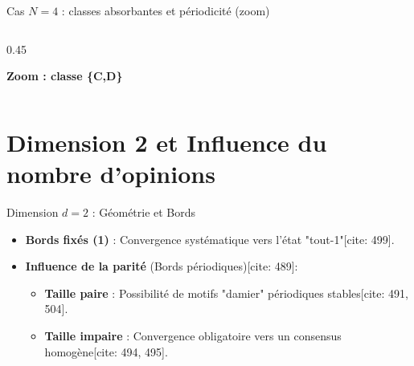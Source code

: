\documentclass{beamer}
\begin{document}
\begin{frame}{Cas $N=4$ : classes absorbantes et périodicité (zoom)}
\begin{columns}
\begin{column}{0.45\textwidth}
\vspace{0.25cm}

\textbf{Zoom : classe \{C,D\}}

\vspace{0.08cm}

\vfill 
\vspace{0.15cm} 


\end{column}

\end{columns}

\end{frame}


\section{Dimension 2 et Influence du nombre d'opinions}

\begin{frame}{Dimension $d=2$ : Géométrie et Bords}
  \begin{itemize}
    \item \textbf{Bords fixés (1)} : Convergence systématique vers l'état "tout-1"[cite: 499].
    \item \textbf{Influence de la parité} (Bords périodiques)[cite: 489]:
    \begin{itemize}
        \item \textbf{Taille paire} : Possibilité de motifs "damier" périodiques stables[cite: 491, 504].
        \item \textbf{Taille impaire} : Convergence obligatoire vers un consensus homogène[cite: 494, 495].
    \end{itemize}
  \end{itemize}
  \end{frame}
\end{document}
